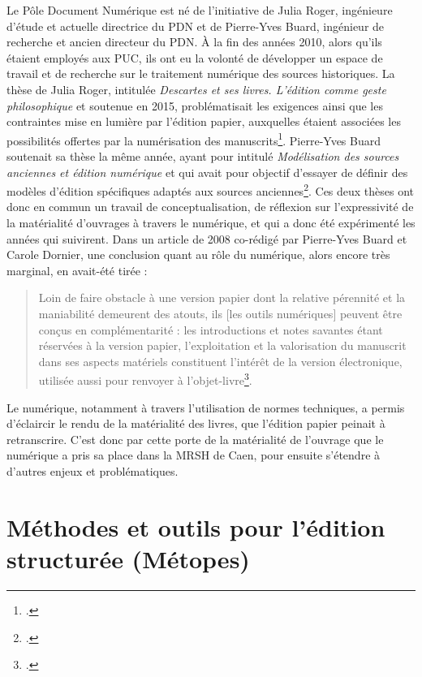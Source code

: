 \documentclass[a4paper,12pt,twoside]{book}
\begin{document}
    Le Pôle Document Numérique est né de l'initiative de Julia Roger, ingénieure d'étude et actuelle directrice du \acrshort{PDN} et de Pierre-Yves Buard, ingénieur de recherche et ancien directeur du \acrshort{PDN}. À la fin des années 2010, alors qu'ils étaient employés aux \acrshort{PUC}, ils ont eu la volonté de développer un espace de travail et de recherche sur le traitement numérique des sources historiques. La thèse de Julia Roger, intitulée \og\textit{Descartes et ses livres. L'édition comme geste philosophique} \fg{} et soutenue en 2015, problématisait les exigences ainsi que les contraintes mise en lumière par l'édition papier, auxquelles étaient associées les possibilités offertes par la numérisation des manuscrits\footcite{roger_descartes_2015}. Pierre-Yves Buard soutenait sa thèse la même année, ayant pour intitulé \og \textit{Modélisation des sources anciennes et édition numérique} \fg{} et qui avait pour objectif d'essayer de définir des modèles d'édition spécifiques adaptés aux sources anciennes\footcite{buard_modelisation_2015}. Ces deux thèses ont donc en commun un travail de conceptualisation, de réflexion sur l'expressivité de la matérialité d'ouvrages à travers le numérique, et qui a donc été expérimenté les années qui suivirent. Dans un article de 2008 co-rédigé par Pierre-Yves Buard et Carole Dornier, une conclusion quant au rôle du numérique, alors encore très marginal, en avait-été tirée :  
    \begin{quote}
        Loin de faire obstacle à une version papier dont la relative pérennité et la maniabilité demeurent des atouts, ils [les outils numériques] peuvent être conçus en complémentarité : les introductions et notes savantes étant réservées à la version papier, l'exploitation et la valorisation du manuscrit dans ses aspects matériels constituent l'intérêt de la version électronique, utilisée aussi pour renvoyer à l'objet-livre\footcite{buard:hal-00322204}.
    \end{quote}
    Le numérique, notamment à travers l'utilisation de normes techniques, a permis d'éclaircir le rendu de la matérialité des livres, que l'édition papier peinait à retranscrire. C'est donc par cette porte de la matérialité de l'ouvrage que le numérique a pris sa place dans la \acrshort{MRSH} de Caen, pour ensuite s'étendre à d'autres enjeux et problématiques.

    \section{Méthodes et outils pour l'édition structurée (Métopes)}
\end{document}

